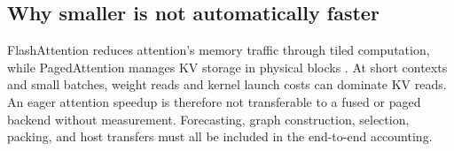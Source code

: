 \subsection{Why smaller is not automatically faster}
FlashAttention reduces attention's memory traffic through tiled computation,
while PagedAttention manages KV storage in physical blocks
\citep{dao2022flash,dao2023flash2,kwon2023paged}. At short contexts and small
batches, weight reads and kernel launch costs can dominate KV reads. An eager
attention speedup is therefore not transferable to a fused or paged backend
without measurement. Forecasting, graph construction, selection, packing, and
host transfers must all be included in the end-to-end accounting.
